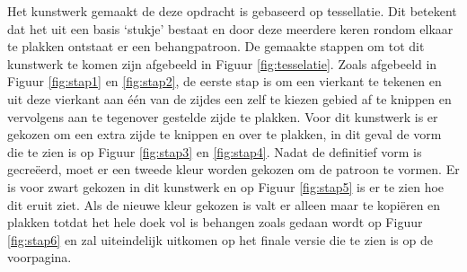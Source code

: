 \documentclass{article}
\begin{document}
Het kunstwerk gemaakt de deze opdracht is gebaseerd op tessellatie. Dit betekent dat het uit een basis `stukje' bestaat en door deze meerdere keren rondom elkaar te plakken ontstaat er een behangpatroon. De gemaakte stappen om tot dit kunstwerk te komen zijn afgebeeld in Figuur \ref{fig:tesselatie}. Zoals afgebeeld in  Figuur \ref{fig:stap1} en \ref{fig:stap2}, de eerste stap is om een vierkant te tekenen en uit deze vierkant aan \'e\'en van de zijdes een zelf te kiezen gebied af te knippen en vervolgens aan te tegenover gestelde zijde te plakken. Voor dit kunstwerk is er gekozen om een extra zijde te knippen en over te plakken, in dit geval de vorm die te zien is op Figuur \ref{fig:stap3} en \ref{fig:stap4}. Nadat de definitief vorm is gecreëerd, moet er een tweede kleur worden gekozen om de patroon te vormen. Er is voor zwart gekozen in dit kunstwerk en op Figuur \ref{fig:stap5} is er te zien hoe dit eruit ziet. Als de nieuwe kleur gekozen is valt er alleen maar te kopi\"eren en plakken totdat het hele doek vol is behangen zoals gedaan wordt op Figuur \ref{fig:stap6} en zal uiteindelijk uitkomen op het finale versie die te zien is op de voorpagina.
\end{document}
